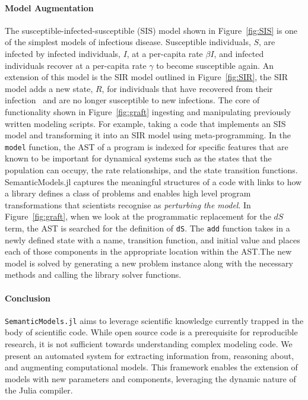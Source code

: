 \documentclass{juliacon}
\newcommand{\semanticModels}{\nohyphens{\texttt{SemanticModels.jl}}}
\begin{document}
\paragraph{Model Augmentation}\label{par:model_augmentation}
The susceptible-infected-susceptible (SIS) model shown in Figure~\ref{fig:SIS} is one of the simplest models of infectious disease.
Susceptible individuals, $S$, are infected by infected individuals, $I$, at a per-capita rate $\beta I$, and infected individuals recover at a per-capita rate $\gamma$ to become susceptible again.
An extension of this model is the SIR model outlined in Figure~\ref{fig:SIR}, the SIR model adds a new state, $R$, for individuals that have recovered from their infection~\cite{epirecipes} and are no longer susceptible to new infections.
The core of functionality shown in Figure~\ref{fig:graft} ingesting and manipulating previously written modeling scripts. For example, taking a code that implements an SIS model and transforming it into an SIR model using meta-programming.
In the \texttt{model} function, the AST of a program is indexed for specific features that are known to be important for dynamical systems such as the states that the population can occupy, the rate relationships, and the state transition functions.
SemanticModels.jl captures the meaningful structures of a code with links to how a library defines a class of problems and enables high level program transformations that scientists recognise as \emph{perturbing the model}.
In Figure~\ref{fig:graft}, when we look at the programmatic replacement for the $dS$ term, the AST is searched for the definition of \texttt{dS}.
The \texttt{add} function takes in a newly defined state with a name, transition function, and initial value and places each of those components in the appropriate location within the AST.\@ The new model is solved by generating a new problem instance along with the necessary methods and calling the library solver functions.


\paragraph{Conclusion}\label{par:conclusion}
\semanticModels{} aims to leverage scientific knowledge currently trapped in the body of scientific code.
While open source code is a prerequisite for reproducible research, it is not sufficient towards understanding complex modeling code.
We present an automated system for extracting information from, reasoning about, and augmenting computational models.
This framework enables the extension of models with new parameters and components, leveraging the dynamic nature of the Julia compiler.
\end{document}
